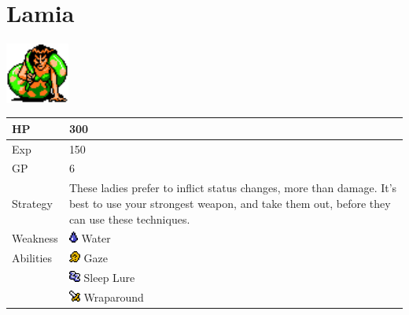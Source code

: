 \section{Lamia}
\label{monster:lamia}

\includegraphics[height=2cm,keepaspectratio]{./resources/monster/lamia}

\begin{longtable}{ l p{9cm} }
	HP
	& 300
\\ \hline
	Exp
	& 150
\\ \hline
	GP
	& 6
\\ \hline
	Strategy
	& These ladies prefer to inflict status changes, more than damage. It's best to use your strongest weapon, and take them out, before they can use these techniques.
\\ \hline
	Weakness
	& \includegraphics[height=1em,keepaspectratio]{./resources/effects/water} Water
\\ \hline
	Abilities
	& \includegraphics[height=1em,keepaspectratio]{./resources/effects/confusion} Gaze \\
	& \includegraphics[height=1em,keepaspectratio]{./resources/effects/sleep} Sleep Lure \\
	& \includegraphics[height=1em,keepaspectratio]{./resources/effects/damage} Wraparound
\end{longtable}
